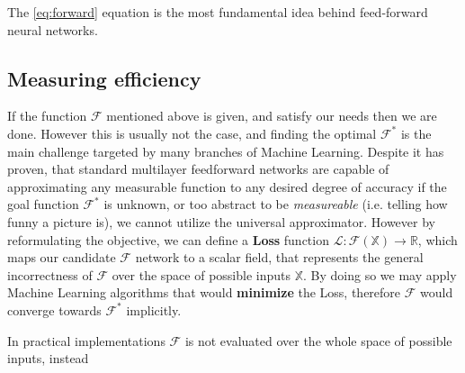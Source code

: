 The \ref{eq:forward} equation is the most fundamental idea behind feed-forward neural networks.

\subsection{Measuring efficiency}
If the function $\mathcal{F}$ mentioned above is given, and satisfy our needs then we are done.
However this is usually not the case, and finding the optimal $\mathcal{F}^*$ is the main challenge targeted by many branches of Machine Learning.
Despite it has proven, that standard multilayer
feedforward networks are capable of approximating
any measurable function to any desired degree of
accuracy \cite{hornik1989multilayer}
if the goal function $\mathcal{F}^*$ is unknown, 
or too abstract to be \emph{measureable} (i.e. telling how funny a picture is), 
we cannot utilize the universal approximator. 
However by reformulating the objective, we can define a \textbf{Loss} function $\mathcal{L}:\mathcal{F}(\mathbb{X}) \rightarrow \mathbb{R}$,
which maps our candidate $\mathcal{F}$ network to a scalar field, that represents the general incorrectness of $\mathcal{F}$ over the space of possible inputs $\mathbb{X}$.
By doing so we may apply Machine Learning algorithms that would \textbf{minimize} the Loss, therefore $\mathcal{F}$ would converge towards $\mathcal{F}^*$ implicitly.

In practical implementations $\mathcal{F}$ is not evaluated over the whole space of possible inputs, instead 


